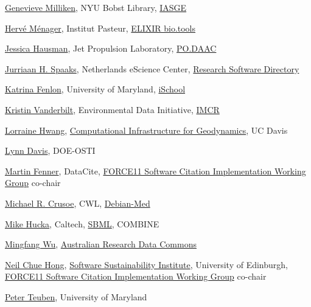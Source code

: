 \documentclass[11pt]{article}
\begin{document}
\begin{spacing}{0.86}
\href{https://orcid.org/0000-0002-3057-0659}{Genevieve Milliken}, NYU Bobst Library, \href{https://investigating-archiving-git.gitlab.io/}{IASGE}

\href{https://orcid.org/0000-0002-7552-1009}{Hervé Ménager}, Institut Pasteur, \href{https://bio.tools/}{ELIXIR bio.tools}

\href{https://orcid.org/0000-0002-1861-1526}{Jessica Hausman}, Jet Propulsion Laboratory, \href{https://podaac.jpl.nasa.gov/}{PO.DAAC}

\href{https://orcid.org/0000-0002-7064-4069}{Jurriaan H. Spaaks}, Netherlands eScience Center, \href{https://www.research-software.nl/}{Research Software Directory}

\href{https://orcid.org/0000-0003-1483-5335}{Katrina Fenlon}, University of Maryland, \href{https://ischool.umd.edu/}{iSchool}

\href{https://orcid.org/0000-0003-1439-2204}{Kristin Vanderbilt}, Environmental Data Initiative, \href{https://imcr-hackathon.github.io/website/}{IMCR}

\href{http://orcid.org/0000-0002-1021-3101}{Lorraine Hwang}, \href{https://geodynamics.org/}{Computational Infrastructure for Geodynamics}, UC Davis

\href{https://orcid.org/0000-0002-4670-0964}{Lynn Davis}, DOE-OSTI

\href{https://orcid.org/0000-0003-1419-2405}{Martin Fenner}, DataCite, \href{https://www.force11.org/group/software-citation-implementation-working-group}{FORCE11 Software Citation Implementation Working Group} co-chair

\href{https://orcid.org/0000-0002-2961-9670}{Michael R. Crusoe}, CWL, \href{https://www.debian.org/devel/debian-med/}{Debian-Med}

\href{https://orcid.org/0000-0001-9105-5960}{Mike Hucka}, Caltech, \href{http://sbml.org/Main_Page}{SBML}, COMBINE

\href{https://orcid.org/0000-0003-1206-3431}{Mingfang Wu}, \href{https://ardc.edu.au/}{Australian Research Data Commons}

\href{https://orcid.org/0000-0002-8876-7606}{Neil Chue Hong}, \href{https://www.software.ac.uk/}{Software Sustainability Institute}, University of Edinburgh, \href{https://www.force11.org/group/software-citation-implementation-working-group}{FORCE11 Software Citation Implementation Working Group} co-chair

\href{https://orcid.org/0000-0003-1774-3436}{Peter Teuben}, University of Maryland


\end{spacing}
\end{document}
